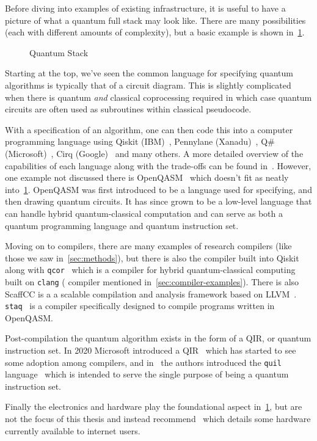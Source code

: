 Before diving into examples of existing infrastructure, it is useful to have a picture of what a quantum full stack may look like.
There are many possibilities (each with different amounts of complexity), but a basic example is shown in~\cref{fig:quantumstack}.

\begin{figure}[h]
    \centering
    
    \caption{Quantum Stack}\label{fig:quantumstack}
\end{figure}

Starting at the top, we've seen the common language for specifying quantum algorithms is typically that of a circuit diagram.
This is slightly complicated when there is quantum \emph{and} classical coprocessing required in which case quantum circuits are often used as subroutines within classical pseudocode.

With a specification of an algorithm, one can then code this into a computer programming language using Qiskit (IBM)~\cite{qiskit}, Pennylane (Xanadu)~\cite{pennylane}, Q\# (Microsoft)~\cite{qsharp}, Cirq (Google)~\cite{cirq} and many others.
A more detailed overview of the capabilities of each language along with the trade-offs can be found in~\cite{qlangcomparision}.
However, one example not discussed there is OpenQASM~\cite{openqasm2,openqasm3} which doesn't fit as neatly into~\cref{fig:quantumstack}.
OpenQASM was first introduced to be a language used for specifying, and then drawing quantum circuits.
It has since grown to be a low-level language that can handle hybrid quantum-classical computation and can serve as both a quantum programming language and quantum instruction set.

Moving on to compilers, there are many examples of research compilers (like those we saw in~\cref{sec:methods}), but there is also the compiler built into Qiskit along with \texttt{qcor}~\cite{qcor} which is a \CPP{} compiler for hybrid quantum-classical computing built on \texttt{clang} (\CPP{} compiler mentioned in~\cref{sec:compiler-examples}).
There is also ScaffCC is a a scalable compilation and analysis framework based on LLVM~\cite{scaffcc,scaffcc2}.
\texttt{staq}~\cite{staq} is a compiler specifically designed to compile programs written in OpenQASM.

Post-compilation the quantum algorithm exists in the form of a \ac{QIR}, or quantum instruction set.
In 2020 Microsoft introduced a \ac{QIR}~\cite{qir} which has started to see some adoption among compilers, and in~\cite{qisa} the authors introduced the \texttt{quil} language~\cite{quil} which is intended to serve the single purpose of being a quantum instruction set.

Finally the electronics and hardware play the foundational aspect in~\cref{fig:quantumstack}, but are not the focus of this thesis and instead recommend~\cite{qlangcomparision} which details some hardware currently available to internet users.
